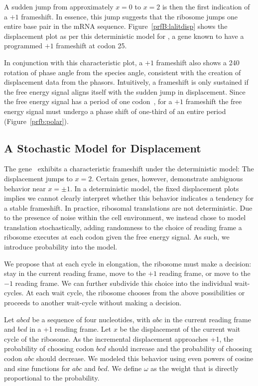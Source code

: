 \documentclass[12pt, draft]{article}
\numberwithin{equation}{section}
\begin{document}
A sudden jump from approximately $x = 0$ to $x = 2$ is then the first indication of a $+1$ frameshift.
In essence, this jump suggests that the ribosome jumps one entire base pair in the mRNA sequence.
Figure~\ref{prfB:lalitdisp} shows the displacement plot as per this deterministic model for \prfB, 
a gene known to have a programmed $+1$ frameshift at codon 25.

In conjunction with this characteristic plot, a $+1$ frameshift also shows a 240\degree
rotation of phase angle from the species angle, consistent with the creation of displacement data from the phasors.
Intuitively, a frameshift is only sustained if the free energy signal aligns itself with the sudden jump in displacement.
Since the free energy signal has a period of one codon~\cite{lalit:mechanics}, for a $+1$ frameshift the free energy signal
must undergo a phase shift of one-third of an entire period (Figure~\ref{prfb:polar}).

\subsection{A Stochastic Model for Displacement}


The gene \prfB\ exhibits a characteristic frameshift under the deterministic model: The displacement jumps to $x=2$.
Certain genes, however, demonstrate ambiguous behavior near $x = \pm 1$.
In a deterministic model, the fixed displacement plots implies
we cannot clearly interpret whether this behavior indicates a tendency for a stable frameshift.
In practice, ribosomal translations are not deterministic. Due to the presence of
noise within the cell environment, we instead chose to model translation stochastically, adding
randomness to the choice of reading frame a ribosome executes at each codon given the free energy signal.
As such, we introduce probability into the model.

We propose that at each cycle in elongation, the ribosome must make a decision: stay in the current reading frame,
move to the $+1$ reading frame,
or move to the $-1$ reading frame.  We can further subdivide this choice into the individual wait-cycles.
At each wait cycle, the ribosome chooses from the above possibilities or proceeds to another wait-cycle without making a decision.

Let $abcd$ be a sequence of four nucleotides, with $abc$ in the
current reading frame and $bcd$ in a +1 reading frame.  Let $x$ be the
displacement of the current wait cycle of the ribosome.  As the
incremental displacement approaches +1, the probability of choosing
codon $bcd$ should increase and the probability of choosing codon
$abc$ should decrease.  We modeled this behavior using even powers of
cosine and sine functions for $abc$ and $bcd$.  We
define $\omega$ as the weight that is directly proportional to
the probability.
\end{document}
